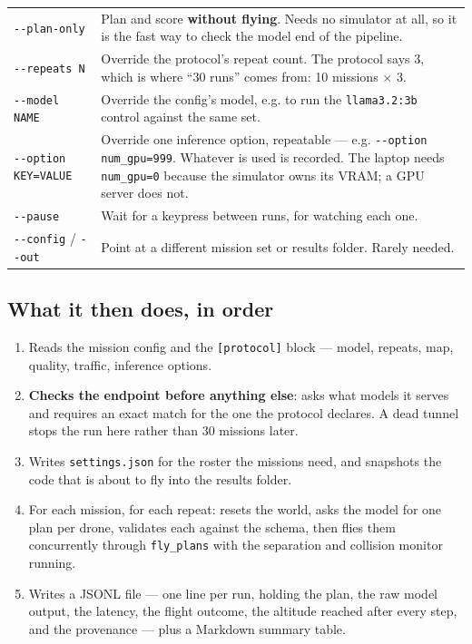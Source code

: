 \documentclass[11pt,a4paper]{article}
\begin{document}
\begin{center}
\begin{tabularx}{\linewidth}{@{}>{\raggedright\arraybackslash}p{5.2cm} X@{}}
\toprule
\texttt{-{}-plan-only} & Plan and score \textbf{without flying}. Needs no
simulator at all, so it is the fast way to check the model end of the pipeline. \\
\texttt{-{}-repeats N} & Override the protocol's repeat count. The protocol says
3, which is where ``30 runs'' comes from: 10 missions $\times$ 3. \\
\texttt{-{}-model NAME} & Override the config's model, e.g. to run the
\texttt{llama3.2:3b} control against the same set. \\
\texttt{-{}-option KEY=VALUE} & Override one inference option, repeatable ---
e.g. \texttt{-{}-option num\_gpu=999}. Whatever is used is recorded. The laptop
needs \texttt{num\_gpu=0} because the simulator owns its VRAM; a GPU server does
not. \\
\texttt{-{}-pause} & Wait for a keypress between runs, for watching each one. \\
\texttt{-{}-config} / \texttt{-{}-out} & Point at a different mission set or
results folder. Rarely needed. \\
\bottomrule
\end{tabularx}
\end{center}

\subsection{What it then does, in order}

\begin{enumerate}
  \item Reads the mission config and the \texttt{[protocol]} block --- model,
        repeats, map, quality, traffic, inference options.
  \item \textbf{Checks the endpoint before anything else}: asks what models it
        serves and requires an exact match for the one the protocol declares. A
        dead tunnel stops the run here rather than 30 missions later.
  \item Writes \texttt{settings.json} for the roster the missions need, and
        snapshots the code that is about to fly into the results folder.
  \item For each mission, for each repeat: resets the world, asks the model for
        one plan per drone, validates each against the schema, then flies them
        concurrently through \texttt{fly\_plans} with the separation and
        collision monitor running.
  \item Writes a JSONL file --- one line per run, holding the plan, the raw
        model output, the latency, the flight outcome, the altitude reached
        after every step, and the provenance --- plus a Markdown summary table.
\end{enumerate}
\end{document}

